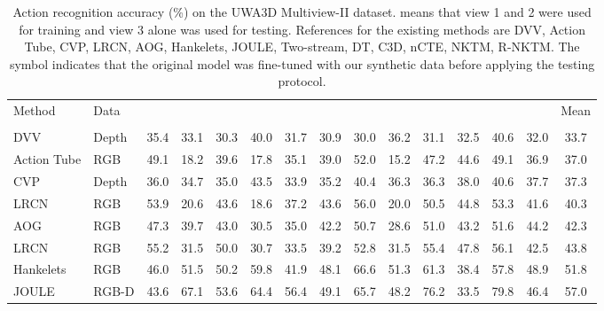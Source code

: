 \documentclass[twocolumn]{svjour3}          \smartqed  \usepackage{graphicx}
\begin{document}
\begin{table*}[t]
\centering
\caption{Action recognition accuracy (\%) on the UWA3D Multiview-II dataset.  means that view 1 and 2 were used for training and view 3 alone was used for testing. References for the existing methods are DVV\citep{DVV}, Action Tube\citep{Action_Tube}, CVP\citep{CVP}, LRCN\citep{LRCN}, AOG\citep{AOG}, Hankelets\citep{Hankelets}, JOULE\citep{hu2015jointly}, Two-stream\citep{simonyan2014two}, DT\citep{wang2011action}, C3D\citep{tran2015learning}, nCTE\citep{nCTE}, NKTM\citep{NKTM}, R-NKTM\citep{rahmani2017learning}. The symbol  indicates that the original model was fine-tuned with our synthetic data before applying the testing protocol.}
\setlength{\tabcolsep}{4.75pt}
\begin{tabular}{llccccccccccccc}
\hline\noalign{\smallskip}
Method & Data &  &  &  &  &  &  &  &  &  &  &  &  & Mean \\
\noalign{\smallskip}\hline\noalign{\smallskip}
\multicolumn{ 15}{c}{\textbf{Baseline}} \\ 
\noalign{\smallskip}\hline\noalign{\smallskip}
DVV & Depth & 35.4 & 33.1 & 30.3 & 40.0 & 31.7 & 30.9 & 30.0 & 36.2 & 31.1 & 32.5 & 40.6 & 32.0 & 33.7 \\ 

Action Tube & RGB & 49.1 & 18.2 & 39.6 & 17.8 & 35.1 & 39.0 & 52.0 & 15.2 & 47.2 & 44.6 & 49.1 & 36.9 & 37.0 \\ 

CVP & Depth & 36.0 & 34.7 & 35.0 & 43.5 & 33.9 & 35.2 & 40.4 & 36.3 & 36.3 & 38.0 & 40.6 & 37.7 & 37.3 \\

LRCN & RGB & 53.9 & 20.6 & 43.6 & 18.6 & 37.2 & 43.6 & 56.0 & 20.0 & 50.5 & 44.8 & 53.3 & 41.6 & 40.3 \\

AOG & RGB & 47.3 & 39.7 & 43.0 & 30.5 & 35.0 & 42.2 & 50.7 & 28.6 & 51.0 & 43.2 & 51.6 & 44.2 & 42.3 \\ 

LRCN & RGB & 55.2 & 31.5 & 50.0 & 30.7 & 33.5 & 39.2 & 52.8 & 31.5 & 55.4 & 47.8 & 56.1 & 42.5 & 43.8 \\

Hankelets & RGB & 46.0 & 51.5 & 50.2 & 59.8 & 41.9 & 48.1 & 66.6 & 51.3 & 61.3 & 38.4 & 57.8 & 48.9 & 51.8 \\ 

JOULE & RGB-D & 43.6 & 67.1 & 53.6 & 64.4 & 56.4 & 49.1 & 65.7 & 48.2 & 76.2 & 33.5 & 79.8 & 46.4 & 57.0 \\ 
       

\end{tabular}
\end{table*}
\end{document}
